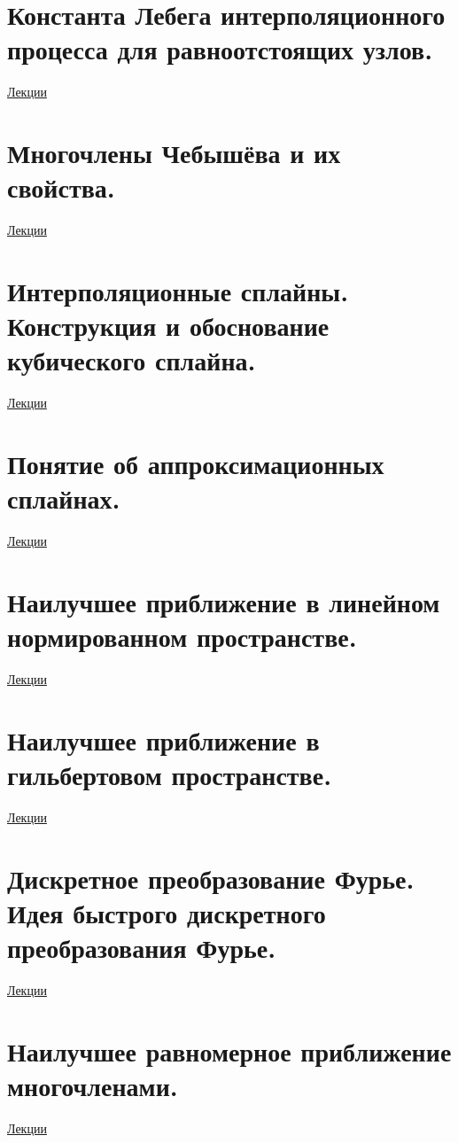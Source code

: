 \documentclass[specialist, subf, href, colorlinks=true, 12pt, times, mtpro, final]{disser}
\theoremstyle{definition}
\begin{document}
\section {Константа Лебега интерполяционного процесса для равноотстоящих узлов.}
	\hyperlink {lects.17}{Лекции}\\

\section {Многочлены Чебышёва и их свойства.}
	\hyperlink {lects.18}{Лекции}\\

\section {Интерполяционные сплайны. Конструкция и обоснование кубического сплайна.}
	\hyperlink {lects.22}{Лекции}\\

\section {Понятие об аппроксимационных сплайнах.}
	\hyperlink {lects.25}{Лекции}\\

\section {Наилучшее приближение в линейном нормированном пространстве.}
	\hyperlink {lects.28}{Лекции}\\

\section {Наилучшее приближение в гильбертовом пространстве.}
	\hyperlink {lects.29}{Лекции}\\

\section {Дискретное преобразование Фурье. Идея быстрого дискретного преобразования Фурье.}
	\hyperlink {lects.32}{Лекции}\\

\section {Наилучшее равномерное приближение многочленами.}
	\hyperlink {lects.35}{Лекции}\\
\end{document}
